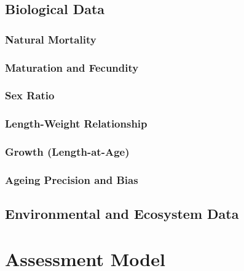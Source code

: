 \documentclass[11pt,
  english,
  letterpaper,
]{article}
\begin{document}
\hypertarget{biological-data}{%
\subsection{Biological Data}\label{biological-data}}

\hypertarget{natural-mortality}{%
\subsubsection{Natural Mortality}\label{natural-mortality}}

\hypertarget{maturation-and-fecundity}{%
\subsubsection{Maturation and Fecundity}\label{maturation-and-fecundity}}

\hypertarget{sex-ratio}{%
\subsubsection{Sex Ratio}\label{sex-ratio}}

\hypertarget{length-weight-relationship-1}{%
\subsubsection{Length-Weight Relationship}\label{length-weight-relationship-1}}

\hypertarget{growth-length-at-age}{%
\subsubsection{Growth (Length-at-Age)}\label{growth-length-at-age}}

\hypertarget{ageing-precision-and-bias}{%
\subsubsection{Ageing Precision and Bias}\label{ageing-precision-and-bias}}

\hypertarget{environmental-and-ecosystem-data}{%
\subsection{Environmental and Ecosystem Data}\label{environmental-and-ecosystem-data}}

\hypertarget{assessment-model}{%
\section{Assessment Model}\label{assessment-model}}
\end{document}
